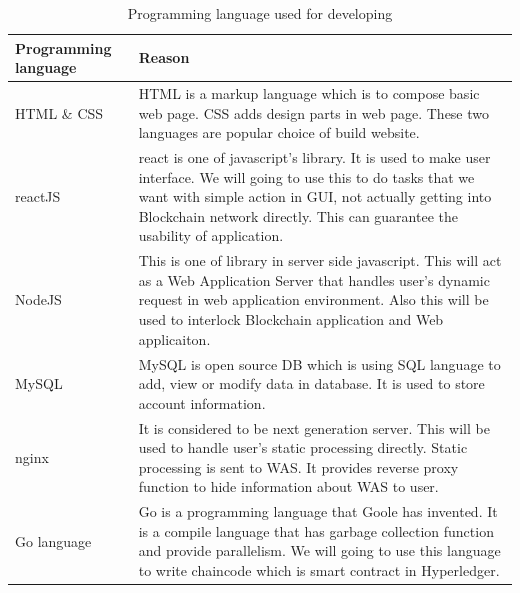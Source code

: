 \documentclass[conference]{IEEEtran}
\begin{document}
\begin{enumerate} [font=\itshape]
    \begin{table}[htbp]
  \renewcommand{\arraystretch}{1.5}
\caption{Programming language used for developing}
\begin{center}
\begin{tabular}{|p{3cm}|p{4.7cm}|}
\hline
\textbf{Programming language} & \textbf{Reason} \\
\hline
HTML \& CSS & HTML is a markup language which is to compose basic web page. CSS adds design parts in web page. These two languages are popular choice of build website. \\
\hline
reactJS & react is one of javascript's library. It is used to make user interface. We will going to use this to do tasks that we want with simple action in GUI, not actually getting into Blockchain network directly. This can guarantee the usability of application. \\
\hline
 NodeJS &  This is one of library in server side javascript. This will act as a Web Application Server that handles user's dynamic request in web application environment. Also this will be used to interlock Blockchain application and Web applicaiton.\\
\hline
MySQL  & MySQL is open source DB which is using SQL language to add, view or modify data in database. It is used to store account information. \\
\hline
nginx & It is considered to be next generation server. This will be used to handle user's static processing directly. Static processing is sent to WAS. It provides reverse proxy function to hide information about WAS to user.  \\
\hline
Go language & Go is a programming language that Goole has invented. It is a compile language that has garbage collection function and provide parallelism. We will going to use this language to write chaincode which is smart contract in Hyperledger. \\
\hline
\end{tabular}
\label{tab1}
\end{center}
\end{table}

\vspace{50mm}
   

\end{enumerate}
\end{document}
